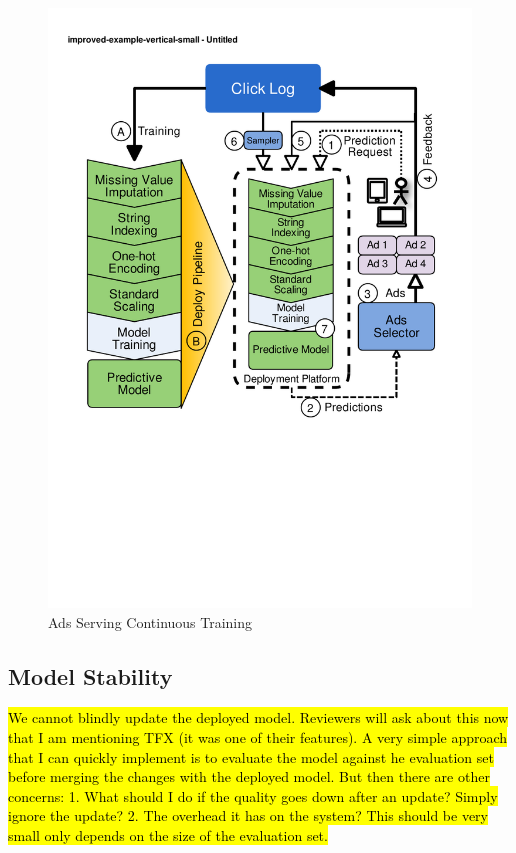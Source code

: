 \begin{figure}[t]
\centering
\includegraphics[width=\columnwidth]{../images/improved-example.pdf}
\caption{Ads Serving Continuous Training}
\label{fig:improved-example}
\end{figure}

\subsection{Model Stability}
\hl{We cannot blindly update the deployed model. Reviewers will ask about this now that I am mentioning TFX (it was one of their features).
A very simple approach that I can quickly implement is to evaluate the model against he evaluation set before merging the changes with the deployed model.
But then there are other concerns: 1. What should I do if the quality goes down after an update? Simply ignore the update? 2. The overhead it has on the system? This should be very small only depends on the size of the evaluation set.}

